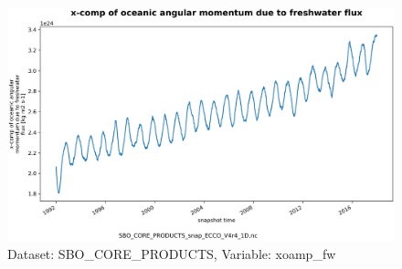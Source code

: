 \begin{figure}[H]
\centering
\includegraphics[scale=0.55]{../images/plots/oneD_plots/SBO_Core_Products/xoamp_fw.png}
\caption{Dataset: SBO\_CORE\_PRODUCTS, Variable: xoamp\_fw}
\label{tab:table-SBO_CORE_PRODUCTS_xoamp_fw-Plot}
\end{figure}
\newpage
\pagebreak
